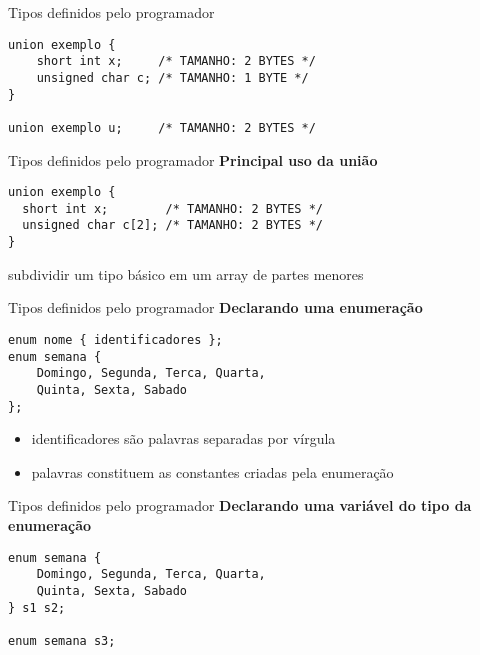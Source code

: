 \documentclass[10pt]{beamer}
\begin{document}
\begin{frame}[fragile]{Tipos definidos pelo programador}
    \large
    \begin{verbatim}
union exemplo {
    short int x;     /* TAMANHO: 2 BYTES */
    unsigned char c; /* TAMANHO: 1 BYTE */
}

union exemplo u;     /* TAMANHO: 2 BYTES */
    \end{verbatim}
\end{frame}

\begin{frame}[fragile]{Tipos definidos pelo programador}
    \huge
    \textbf{Principal uso da união}
    
    \bigskip
    
    \large
    \begin{verbatim}
union exemplo {
  short int x;        /* TAMANHO: 2 BYTES */
  unsigned char c[2]; /* TAMANHO: 2 BYTES */
}
    \end{verbatim}
    
    subdividir um tipo básico em um array de partes menores
\end{frame}

\begin{frame}[fragile]{Tipos definidos pelo programador}
    \huge
    \textbf{Declarando uma enumeração}
    
    \bigskip
    
    \large
    \begin{verbatim}
enum nome { identificadores };
enum semana {
    Domingo, Segunda, Terca, Quarta,
    Quinta, Sexta, Sabado
};
    \end{verbatim}
    
    \large
    \setlength{\leftmargini}{0pt}
    \begin{itemize}
        \item [] identificadores são palavras separadas por vírgula
        \item [] palavras constituem as constantes criadas pela enumeração
    \end{itemize}
\end{frame}


\begin{frame}[fragile]{Tipos definidos pelo programador}
    \huge
    \textbf{Declarando uma variável do tipo da enumeração}
    
    \bigskip
    
    \large
    \begin{verbatim}
enum semana {
    Domingo, Segunda, Terca, Quarta,
    Quinta, Sexta, Sabado
} s1 s2;

enum semana s3;
    \end{verbatim}
\end{frame}
\end{document}
